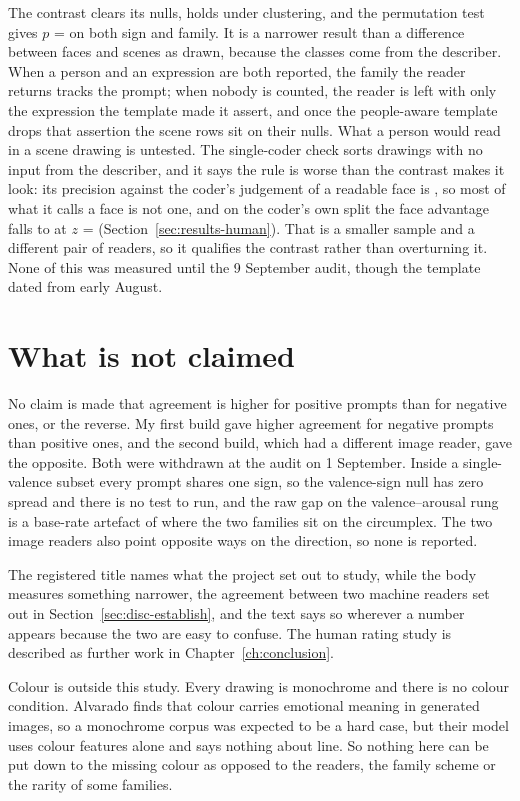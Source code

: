 The contrast clears its nulls, holds under clustering, and the permutation test gives $p$ = \DiffSignP{} on both sign and family. It is a narrower result than a difference between faces and scenes as drawn, because the classes come from the describer. When a person and an expression are both reported, the family the reader returns tracks the prompt; when nobody is counted, the reader is left with only the expression the template made it assert, and once the people-aware template drops that assertion the scene rows sit on their nulls. What a person would read in a scene drawing is untested. The single-coder check sorts drawings with no input from the describer, and it says the rule is worse than the contrast makes it look: its precision against the coder's judgement of a readable face is \HcFacePrec{}, so most of what it calls a face is not one, and on the coder's own split the face advantage falls to \HcPromptDiffPp{} at $z$ = \HcPromptDiffZ{} (Section~\ref{sec:results-human}). That is a smaller sample and a different pair of readers, so it qualifies the contrast rather than overturning it. None of this was measured until the 9 September audit, though the template dated from early August.

\section{What is not claimed}
\label{sec:disc-not-claimed}

No claim is made that agreement is higher for positive prompts than for negative ones, or the reverse. My first build gave higher agreement for negative prompts than positive ones, and the second build, which had a different image reader, gave the opposite. Both were withdrawn at the audit on 1 September. Inside a single-valence subset every prompt shares one sign, so the valence-sign null has zero spread and there is no test to run, and the raw gap on the valence--arousal rung is a base-rate artefact of where the two families sit on the circumplex. The two image readers also point opposite ways on the direction, so none is reported.

The registered title names what the project set out to study, while the body measures something narrower, the agreement between two machine readers set out in Section~\ref{sec:disc-establish}, and the text says so wherever a number appears because the two are easy to confuse. The human rating study is described as further work in Chapter~\ref{ch:conclusion}.

Colour is outside this study. Every drawing is monochrome and there is no colour condition. Alvarado \cite{alvarado2025texttoimage} finds that colour carries emotional meaning in generated images, so a monochrome corpus was expected to be a hard case, but their model uses colour features alone and says nothing about line. So nothing here can be put down to the missing colour as opposed to the readers, the family scheme or the rarity of some families.


